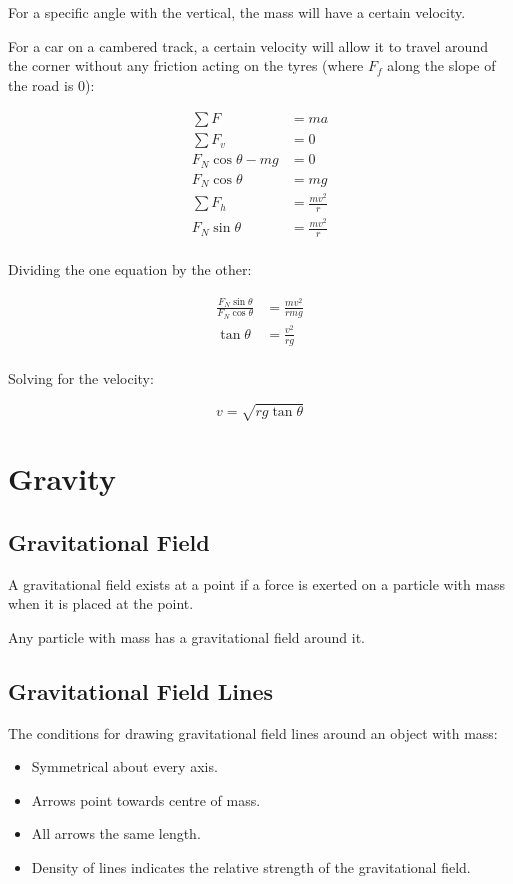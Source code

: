 \documentclass[a4paper,11pt]{report}
\begin{document}
For a specific angle with the vertical, the mass will have a certain velocity.

For a car on a cambered track, a certain velocity will allow it to travel
around the corner without any friction acting on the tyres (where $F_f$ along
the slope of the road is 0):

$$
\begin{aligned}
\sum F & = ma \\
\sum F_v & = 0 \\
F_N \cos{\theta} - mg & = 0 \\
F_N \cos{\theta} & = mg \\
\sum F_h & = \frac{mv^2}{r} \\
F_N \sin{\theta} & = \frac{mv^2}{r} \\
\end{aligned}
$$

Dividing the one equation by the other:

$$
\begin{aligned}
\frac{F_N \sin{\theta}}{F_N \cos{\theta}} & = \frac{mv^2}{rmg} \\
\tan{\theta} & = \frac{v^2}{rg} \\
\end{aligned}
$$

Solving for the velocity:

$$
v = \sqrt{rg \tan{\theta}}
$$


\section{Gravity}

\subsection{Gravitational Field}

A gravitational field exists at a point if a force is exerted on a particle
with mass when it is placed at the point.

Any particle with mass has a gravitational field around it.

\subsection{Gravitational Field Lines}

The conditions for drawing gravitational field lines around an object with mass:

\begin{itemize}
\item Symmetrical about every axis.
\item Arrows point towards centre of mass.
\item All arrows the same length.
\item Density of lines indicates the relative strength of the gravitational
	field.
\end{itemize}
\end{document}
